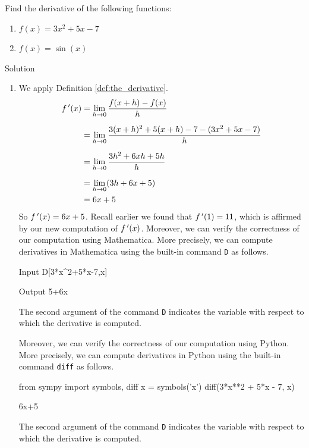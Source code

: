 \begin{example}\label{ex_deriv1}
Find the derivative of the following functions:
\begin{multicols}{2}
\begin{enumerate}
\item  $f(x) = 3x^2+5x-7$
\item $f(x) = \sin(x)$
\end{enumerate}
\end{multicols}

Solution 

\begin{enumerate}
\item We apply Definition \ref{def:the_derivative}.
	\begin{align*}
	f\,'(x) &= \lim_{h\to 0} \dfrac{f(x+h)-f(x)}{h} \\[0.2cm]
					&=	\lim_{h\to 0} \dfrac{3(x+h)^2+5(x+h)-7-(3x^2+5x-7)}{h}\\[0.2cm]
					&=	\lim_{h\to 0} \dfrac{3h^2 +6xh+5h}{h}\\[0.2cm]
					&= \lim_{h\to 0} (3h+6x+5)\\
					&= 6x+5
	\end{align*}
	So $f\,'(x) = 6x+5$. Recall earlier we found that $f\,'(1) = 11$, which is affirmed by our new computation of $f\,'(x)$. 
	\ifmathematica
	\ifcourse Moreover, we can verify the correctness of our computation using Mathematica. More precisely, we can compute derivatives in Mathematica using the built-in command \lstinline{D} as follows.
	\begin{mdframed}[default,backgroundcolor=gray!40,roundcorner=8pt]
\begin{mmaCell}[morefunctionlocal={x}]{Input}
  D[3*x^2+5*x-7,x]
\end{mmaCell}

\begin{mmaCell}{Output}
  5+6x
\end{mmaCell}
\end{mdframed}
The second argument of the command \lstinline{D} indicates the variable with respect to which the derivative is computed. 
\fi
\fi

\ifpython
\ifcourse Moreover, we can verify the correctness of our computation using Python. More precisely, we can compute derivatives in Python using the built-in command \lstinline{diff} as follows.
\begin{pyin}
from sympy import symbols, diff
x = symbols('x')
diff(3*x**2 + 5*x - 7, x)
\end{pyin}
\begin{pyout}
6x+5
\end{pyout}
The second argument of the command \lstinline{D} indicates the variable with respect to which the derivative is computed.
 \fi
\fi


\end{enumerate}
\end{example}
